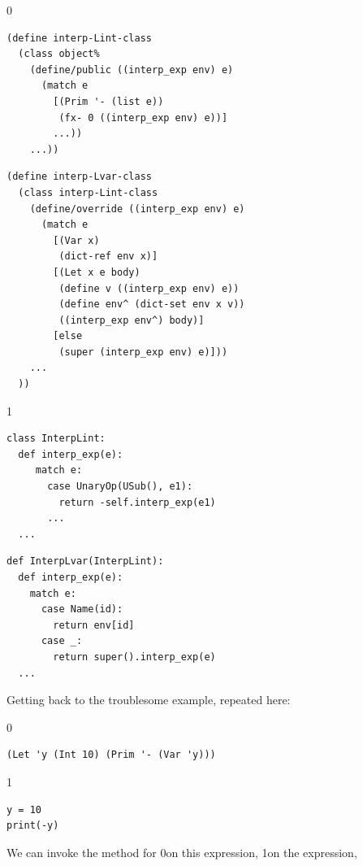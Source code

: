 \documentclass[7x10]{TimesAPriori_MIT}%
\def\racketEd{0}
\def\pythonEd{1}
\def\edition{1}
\newcommand{\racket}[1]{{\if\edition\racketEd{#1}\fi}}
\newcommand{\pythonColor}[0]{}
\newcommand{\python}[1]{{\if\edition\pythonEd\pythonColor #1\fi}}
\numberwithin{theorem}{chapter}
\numberwithin{definition}{chapter}
\numberwithin{equation}{chapter}
\begin{document}
\begin{center}
  \hspace{-20pt}
{\if\edition\racketEd  
\begin{minipage}{0.45\textwidth}
\begin{lstlisting}
(define interp-Lint-class
  (class object%
    (define/public ((interp_exp env) e)
      (match e
        [(Prim '- (list e))
         (fx- 0 ((interp_exp env) e))]
        ...))
    ...))
\end{lstlisting}
\end{minipage}
\begin{minipage}{0.45\textwidth}
  \begin{lstlisting}
(define interp-Lvar-class
  (class interp-Lint-class
    (define/override ((interp_exp env) e)
      (match e
        [(Var x)
         (dict-ref env x)]
        [(Let x e body)
         (define v ((interp_exp env) e))
         (define env^ (dict-set env x v))
         ((interp_exp env^) body)]
        [else
         (super (interp_exp env) e)]))
    ...
  ))
\end{lstlisting}
\end{minipage}
\fi}
{\if\edition\pythonEd\pythonColor
\begin{minipage}{0.45\textwidth}
\begin{lstlisting}
class InterpLint:
  def interp_exp(e):
     match e:
       case UnaryOp(USub(), e1):
         return -self.interp_exp(e1)
       ...
  ...
\end{lstlisting}
\end{minipage}
\begin{minipage}{0.45\textwidth}
  \begin{lstlisting}
def InterpLvar(InterpLint):
  def interp_exp(e):
    match e:
      case Name(id):
        return env[id]
      case _:
        return super().interp_exp(e)
  ...
\end{lstlisting}
\end{minipage}
\fi}
\end{center}
Getting back to the troublesome example, repeated here:
{\if\edition\racketEd  
\begin{lstlisting}
(Let 'y (Int 10) (Prim '- (Var 'y)))
\end{lstlisting}
\fi}
{\if\edition\pythonEd\pythonColor
\begin{lstlisting}
y = 10
print(-y)
\end{lstlisting}
\fi}
\noindent We can invoke the  method for \LangVar{}
\racket{on this expression,}
\python{on the  expression,}%
\end{document}
